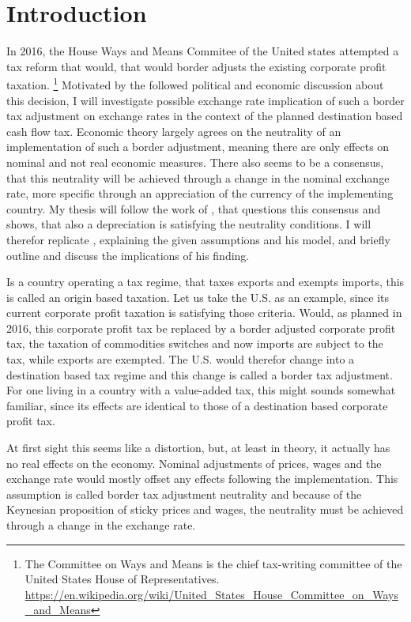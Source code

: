 

\section{Introduction}

In 2016, the House Ways and Means Commitee of the United states attempted a tax reform that would, that would border adjusts the existing corporate profit taxation. \footnote{The Committee on Ways and Means is the chief tax-writing committee of the United States House of Representatives. \url{https://en.wikipedia.org/wiki/United_States_House_Committee_on_Ways_and_Means}} Motivated by the followed political and economic discussion about this decision, I will investigate possible exchange rate implication of such a border tax adjustment on exchange rates in the context of the planned destination based cash flow tax.  Economic theory largely agrees on the neutrality of an implementation of such a border adjustment, meaning there are only effects on nominal and not real economic measures. There also seems to be a consensus, that this neutrality will be achieved through a change in the nominal exchange rate, more specific through an appreciation of the currency of the implementing country. My thesis will follow the work of 
\cite{buiter2017exchange}, that questions this consensus and shows, that also a depreciation is satisfying the neutrality conditions. I will therefor replicate \cite{buiter2017exchange}, explaining the given assumptions and his model, and briefly outline and discuss the implications of his finding.  

Is a country operating a tax regime, that taxes exports and exempts imports, this is called an origin based taxation. Let us take the U.S. as an example, since its current corporate profit taxation is satisfying those criteria. Would, as planned in 2016, this corporate profit tax be replaced by a border adjusted corporate profit tax, the taxation of commodities switches and now imports are subject to the tax, while exports are exempted. The U.S. would therefor change into a destination based tax regime and this change is called a border tax adjustment. For one living in a country with a value-added tax, this might sounds somewhat familiar, since its effects are identical to those of a destination based corporate profit tax. 

At first sight this seems like a distortion, but, at least in theory, it actually has no real effects on the economy. Nominal adjustments of prices, wages and the exchange rate would mostly offset any effects following the implementation. This assumption is called border tax adjustment neutrality and because of the Keynesian proposition of sticky prices and wages, the neutrality must be achieved through a change in the exchange rate.

